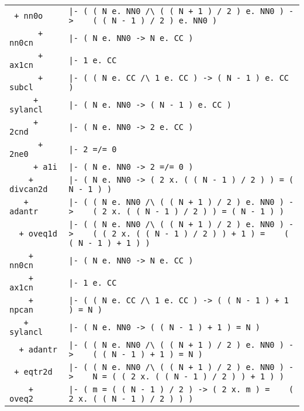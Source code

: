 \documentclass{article}
\begin{document}
\begin{tabular}{ |l|p{105mm}| }
\hline
\verb| + nn0o       | & \verb!|- ( ( N e. NN0 /\ ( ( N + 1 ) / 2 ) e. NN0 ) -> !\newline\verb!   ( ( N - 1 ) / 2 ) e. NN0 )! \\
\verb|      + nn0cn | & \verb!|- ( N e. NN0 -> N e. CC )! \\
\verb|      + ax1cn | & \verb!|- 1 e. CC! \\
\verb|      + subcl | & \verb!|- ( ( N e. CC /\ 1 e. CC ) -> ( N - 1 ) e. CC )! \\
\verb|     + sylancl| & \verb!|- ( N e. NN0 -> ( N - 1 ) e. CC )! \\
\verb|     + 2cnd   | & \verb!|- ( N e. NN0 -> 2 e. CC )! \\
\verb|      + 2ne0  | & \verb!|- 2 =/= 0! \\
\verb|     + a1i    | & \verb!|- ( N e. NN0 -> 2 =/= 0 )! \\
\verb|    + divcan2d| & \verb!|- ( N e. NN0 -> ( 2 x. ( ( N - 1 ) / 2 ) ) = ( N - 1 ) )! \\
\verb|   + adantr   | & \verb!|- ( ( N e. NN0 /\ ( ( N + 1 ) / 2 ) e. NN0 ) -> !\newline\verb!   ( 2 x. ( ( N - 1 ) / 2 ) ) = ( N - 1 ) )! \\
\verb|  + oveq1d    | & \verb!|- ( ( N e. NN0 /\ ( ( N + 1 ) / 2 ) e. NN0 ) -> !\newline\verb!   ( ( 2 x. ( ( N - 1 ) / 2 ) ) + 1 ) = !\newline\verb!   ( ( N - 1 ) + 1 ) )! \\
\verb|    + nn0cn   | & \verb!|- ( N e. NN0 -> N e. CC )! \\
\verb|    + ax1cn   | & \verb!|- 1 e. CC! \\
\verb|    + npcan   | & \verb!|- ( ( N e. CC /\ 1 e. CC ) -> ( ( N - 1 ) + 1 ) = N )! \\
\verb|   + sylancl  | & \verb!|- ( N e. NN0 -> ( ( N - 1 ) + 1 ) = N )! \\
\verb|  + adantr    | & \verb!|- ( ( N e. NN0 /\ ( ( N + 1 ) / 2 ) e. NN0 ) -> !\newline\verb!   ( ( N - 1 ) + 1 ) = N )! \\
\verb| + eqtr2d     | & \verb!|- ( ( N e. NN0 /\ ( ( N + 1 ) / 2 ) e. NN0 ) -> !\newline\verb!   N = ( ( 2 x. ( ( N - 1 ) / 2 ) ) + 1 ) )! \\
\verb|    + oveq2   | & \verb!|- ( m = ( ( N - 1 ) / 2 ) -> ( 2 x. m ) = !\newline\verb!   ( 2 x. ( ( N - 1 ) / 2 ) ) )! \\

\end{tabular}
\end{document}
